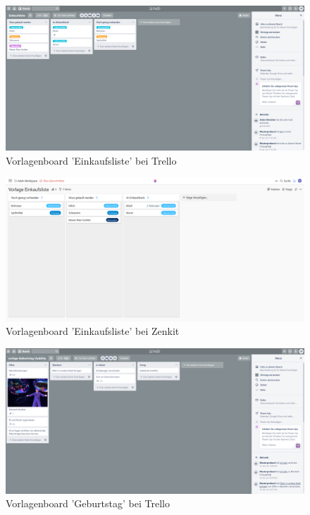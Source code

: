 \begin{figure}[H]
    \includegraphics[width=\textwidth]{images/UI/Einkaufsliste.PNG}
    \centering
    \caption{Vorlagenboard 'Einkaufsliste' bei Trello}
    \label{fig:trelloeinkauf}
\end{figure}

\begin{figure}[H]
    \includegraphics[width=\textwidth]{images/UI/zenkiteinkaufsliste.PNG}
    \centering
    \caption{Vorlagenboard 'Einkaufsliste' bei Zenkit}
    \label{fig:zenkiteinkauf}
\end{figure}

\begin{figure}[H]
    \includegraphics[width=\textwidth]{images/UI/Board Geburtstag.PNG}
    \centering
    \caption{Vorlagenboard 'Geburtstag' bei Trello}
    \label{fig:trellogebu}
\end{figure}

